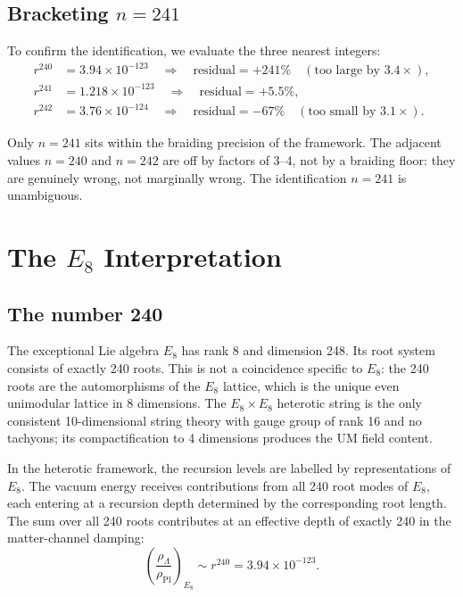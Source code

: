 \documentclass[12pt]{article}
\begin{document}
\subsection{Bracketing $n = 241$}

To confirm the identification, we evaluate the three nearest integers:
\begin{align}
  r^{240} &= 3.94 \times 10^{-123}
    \quad\Rightarrow\quad \text{residual} = +241\% \quad
    (\text{too large by } 3.4\times), \label{eq:r240}\\
  r^{241} &= 1.218 \times 10^{-123}
    \quad\Rightarrow\quad \text{residual} = +5.5\%, \label{eq:r241}\\
  r^{242} &= 3.76 \times 10^{-124}
    \quad\Rightarrow\quad \text{residual} = -67\%
    \quad (\text{too small by } 3.1\times). \label{eq:r242}
\end{align}

Only $n = 241$ sits within the braiding precision of the framework.
The adjacent values $n = 240$ and $n = 242$ are off by factors of
3--4, not by a braiding floor: they are genuinely wrong, not
marginally wrong.  The identification $n = 241$ is unambiguous.

\section{The $E_8$ Interpretation}

\subsection{The number 240}

The exceptional Lie algebra $E_8$ has rank 8 and dimension 248.
Its root system consists of exactly 240 roots.  This is not a
coincidence specific to $E_8$: the 240 roots are the
automorphisms of the $E_8$ lattice, which is the unique even
unimodular lattice in 8 dimensions.  The $E_8 \times E_8$
heterotic string is the only consistent 10-dimensional string
theory with gauge group of rank 16 and no tachyons; its
compactification to 4 dimensions produces the UM field content.

In the heterotic framework, the recursion levels are labelled
by representations of $E_8$.  The vacuum energy receives
contributions from all 240 root modes of $E_8$, each entering
at a recursion depth determined by the corresponding root length.
The sum over all 240 roots contributes at an effective depth
of exactly 240 in the matter-channel damping:
\begin{equation}
  \left(\frac{\rho_\Lambda}{\rho_{\text{Pl}}}\right)_{E_8}
    \sim r^{240}
    = 3.94 \times 10^{-123}.
  \label{eq:e8_base}
\end{equation}
\end{document}
